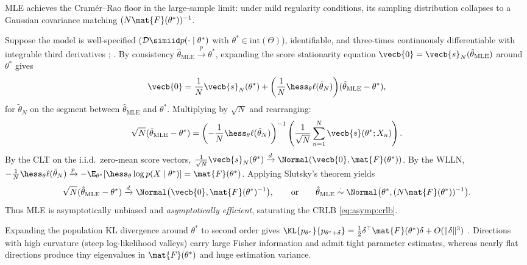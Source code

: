 \documentclass[../../../../master.tex]{subfiles}
\begin{document}
MLE achieves the Cram\'er--Rao floor in the large-sample limit: under mild regularity conditions, its sampling distribution collapses to a Gaussian covariance matching $(N\mat{F}(\theta^*))^{-1}$.

\begin{coremath}
Suppose the model is well-specified ($\mathcal{D} \simiid p(\cdot \mid \theta^*)$ with $\theta^* \in \mathrm{int}(\Theta)$), identifiable, and three-times continuously differentiable with integrable third derivatives ; . By consistency $\hat{\theta}_{\mathrm{MLE}} \xrightarrow{p} \theta^*$, expanding the score stationarity equation $\vecb{0} = \vecb{s}_N(\hat{\theta}_{\mathrm{MLE}})$ around $\theta^*$ gives
\begin{equation}
\vecb{0} = \frac{1}{N}\vecb{s}_N(\theta^*) + \left(\frac{1}{N}\hess_\theta \ell(\tilde{\theta}_N)\right)\!(\hat{\theta}_{\mathrm{MLE}} - \theta^*),
\end{equation}
for $\tilde{\theta}_N$ on the segment between $\hat{\theta}_{\mathrm{MLE}}$ and $\theta^*$. Multiplying by $\sqrt{N}$ and rearranging:
\begin{equation}
\label{eq:asymp:mle-normality}
\sqrt{N}(\hat{\theta}_{\mathrm{MLE}} - \theta^*) = \left(-\frac{1}{N}\hess_\theta \ell(\tilde{\theta}_N)\right)^{-1} \left(\frac{1}{\sqrt{N}}\sum_{n=1}^N \vecb{s}(\theta^*; X_n)\right).
\end{equation}
By the CLT on the i.i.d.\ zero-mean score vectors, $\frac{1}{\sqrt{N}}\vecb{s}_N(\theta^*) \xrightarrow{d} \Normal(\vecb{0}, \mat{F}(\theta^*))$. By the WLLN, $-\frac{1}{N}\hess_\theta\ell(\tilde{\theta}_N) \xrightarrow{p} -\E_{\theta^*}[\hess_\theta \log p(X\mid\theta^*)] = \mat{F}(\theta^*)$. Applying Slutsky's theorem yields
\begin{equation}
\sqrt{N}(\hat{\theta}_{\mathrm{MLE}} - \theta^*) \xrightarrow{d} \Normal\bigl(\vecb{0}, \mat{F}(\theta^*)^{-1}\bigr), \qquad \text{or} \qquad \hat{\theta}_{\mathrm{MLE}} \stackrel{\cdot}{\sim} \Normal\bigl(\theta^*, (N\mat{F}(\theta^*))^{-1}\bigr).
\end{equation}
Thus MLE is asymptotically unbiased and \emph{asymptotically efficient}, saturating the CRLB \eqref{eq:asymp:crlb}.
\end{coremath}

\begin{intuition}
Expanding the population KL divergence around $\theta^*$ to second order gives $\KL{p_{\theta^*}}{p_{\theta^*+\delta}} = \frac{1}{2}\delta^\top \mat{F}(\theta^*)\delta + O(\|\delta\|^3)$ . Directions with high curvature (steep log-likelihood valleys) carry large Fisher information and admit tight parameter estimates, whereas nearly flat directions produce tiny eigenvalues in $\mat{F}(\theta^*)$ and huge estimation variance.
\end{intuition}
\end{document}
